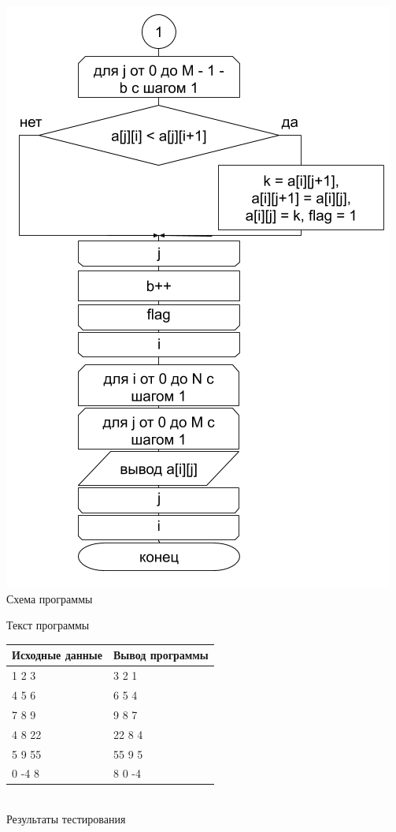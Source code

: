 \documentclass[a4paper,14pt]{extarticle}
\begin{document}
\begin{center}
\includegraphics[scale=0.6]{lab4-3-2.png}\\
Схема программы
\end{center}

\begin{center}
Текст программы\\
\vspace{0.6cm}
\begin{tabular}{|l|l|}
\hline
\multicolumn{1}{|c|}{Исходные данные}& \multicolumn{1}{|c|}{Вывод программы}\\
\hline
1 2 3 & 3 2 1\\
4 5 6 & 6 5 4\\
7 8 9 & 9 8 7\\
\hline
4 8 22 & 22 8 4\\
5 9 55 & 55 9 5\\
0 -4 8 & 8 0 -4\\
\hline
\end{tabular}\\
\vspace{0.3cm}
Результаты тестирования
\end{center}
\end{document}
